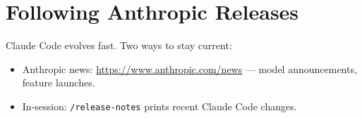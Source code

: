 \section{Following Anthropic Releases}
\label{app:releases}

Claude Code evolves fast. Two ways to stay current:

\begin{itemize}
  \item Anthropic news: \url{https://www.anthropic.com/news} — model
        announcements, feature launches.
  \item In-session: \texttt{/release-notes} prints recent Claude Code
        changes.
\end{itemize}

\nocite{*}
\printbibliography[heading=subbibliography,title={References}]
